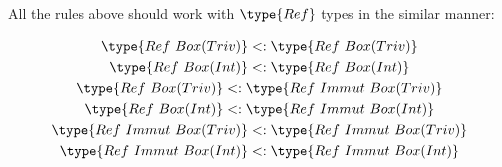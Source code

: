 \documentclass{article}
\newcommand\subtype{\mathrel{<:}}
\begin{document}
\medskip

All the rules above should work with $\type{Ref}$ types in the similar manner:

\begin{gather*}
  \type{Ref\ Box(Triv)} \subtype \type{Ref\ Box(Triv)}\\
  \type{Ref\ Box(Int)} \subtype \type{Ref\ Box(Int)}\\
  \type{Ref\ Box(Triv)} \subtype \type{Ref\ Immut\ Box(Triv)}\\
  \type{Ref\ Box(Int)} \subtype \type{Ref\ Immut\ Box(Int)}\\
  \type{Ref\ Immut\ Box(Triv)} \subtype \type{Ref\ Immut\ Box(Triv)}\\
  \type{Ref\ Immut\ Box(Int)} \subtype \type{Ref\ Immut\ Box(Int)}
\end{gather*}

\end{document}
